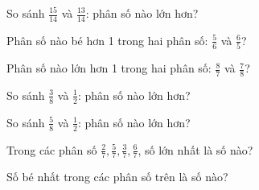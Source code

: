 \begin{ex}
So sánh $\frac{15}{14}$ và $\frac{13}{14}$: phân số nào lớn hơn?
\end{ex}

\begin{ex}
Phân số nào bé hơn 1 trong hai phân số: $\frac{5}{6}$ và $\frac{6}{5}$?
\end{ex}

\begin{ex}
Phân số nào lớn hơn 1 trong hai phân số: $\frac{8}{7}$ và $\frac{7}{8}$?
\end{ex}

\begin{ex}
So sánh $\frac{3}{8}$ và $\frac{1}{2}$: phân số nào lớn hơn?
\end{ex}

\begin{ex}
So sánh $\frac{5}{8}$ và $\frac{1}{2}$: phân số nào lớn hơn?
\end{ex}

\begin{ex}
Trong các phân số $\frac{2}{7}, \frac{5}{7}, \frac{3}{7}, \frac{6}{7}$, số lớn nhất là số nào?
\end{ex}

\begin{ex}
Số bé nhất trong các phân số trên là số nào?
\end{ex}
